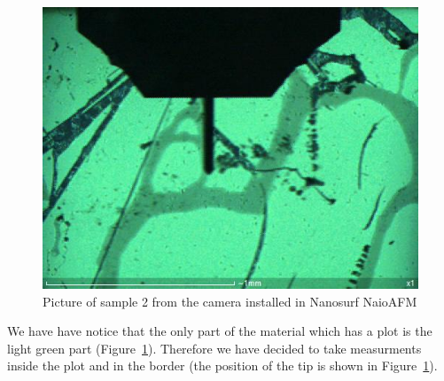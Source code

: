 \documentclass[11pt,a4paper]{article}
\begin{document}
\begin{figure}[ht]
\centering
\includegraphics[scale=0.4]{sm_sample2_set.JPG}
\caption{Picture of sample 2 from the camera installed in Nanosurf NaioAFM}
\label{fig:sample2_set}
\end{figure}

We have have notice that the only part of the material which has a plot is the light green part (Figure~\ref{fig:sample2_set}). Therefore we have decided to take measurments inside the plot and in the border (the position of the tip is shown in Figure~\ref{fig:sample2_set}).
\end{document}
